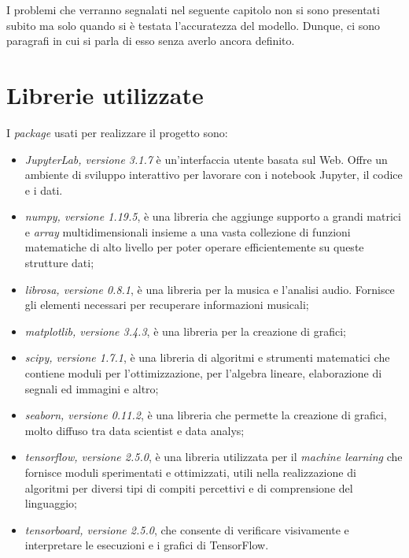 I problemi che verranno segnalati nel seguente capitolo non si sono presentati subito ma solo quando si è testata l'accuratezza del modello. Dunque, ci sono paragrafi in cui si parla di esso senza averlo ancora definito.
\section{Librerie utilizzate}
I \textit{package} usati per realizzare il progetto sono:
\begin{itemize}
	\item \textit{JupyterLab, versione 3.1.7} è un’interfaccia utente basata sul Web. Offre un ambiente di sviluppo interattivo per lavorare con i notebook Jupyter, il codice e i dati.
	\item \textit{numpy, versione 1.19.5}, è una libreria che aggiunge supporto a grandi matrici e \textit{array} multidimensionali insieme a una vasta collezione di funzioni matematiche di alto livello per poter operare efficientemente su queste strutture dati;
	\item \textit{librosa, versione 0.8.1}, è una libreria per la musica e l'analisi audio. Fornisce gli elementi necessari per recuperare informazioni musicali;
	\item \textit{matplotlib, versione 3.4.3}, è una libreria per la creazione di grafici;
	\item \textit{scipy, versione 1.7.1}, è una libreria di algoritmi e strumenti matematici che contiene moduli per l'ottimizzazione, per l'algebra lineare, elaborazione di segnali ed immagini e altro;
	\item \textit{seaborn, versione 0.11.2}, è una libreria che permette la creazione di grafici, molto diffuso tra data scientist e data analys;
	\item \textit{tensorflow, versione 2.5.0}, è una libreria utilizzata per il \textit{machine learning} che fornisce moduli sperimentati e ottimizzati, utili nella realizzazione di algoritmi per diversi tipi di compiti percettivi e di comprensione del linguaggio;
	\item \textit{tensorboard, versione 2.5.0}, che consente di verificare visivamente e interpretare le esecuzioni e i grafici di TensorFlow.
\end{itemize}

